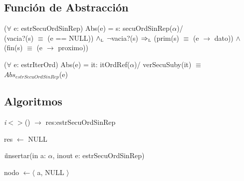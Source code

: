 \vspace{33pt}

\subsection*{Funci\'on de Abstracci\'on}
\vspace{11pt}
($\forall$ e: estrSecuOrdSinRep) Abs(e) = s: secuOrdSinRep($\alpha$)/\\
(vacia?(s) $\equiv$ (e == NULL)) $\land_{\mathrm{\scriptscriptstyle{L}}}$ $\neg$vacia?(s) $\Rightarrow_{\mathrm{\scriptscriptstyle{L}}}$ (prim(s) $\equiv$ (e $\rightarrow$ dato)) $\wedge$ (fin(s) $\equiv$ (e $\rightarrow$ proximo))

\vspace{22pt}

\vspace{11pt}
($\forall$ e: estrIterOrd) Abs(e) = it: itOrdRef($\alpha$)/ verSecuSuby(it) $\equiv$ $Abs_{estrSecuOrdSinRep}$(e)

\vspace{33pt}


\subsection*{Algoritmos}

\textit{i}$<>$() $\longrightarrow$ res:estrSecuOrdSinRep\\
\begin{algorithm}[H]
\BlankLine
res $\leftarrow$ NULL
\end{algorithm}

\textit{i}insertar(in a: $\alpha$, inout e: estrSecuOrdSinRep)\\
\begin{algorithm}[H]
\BlankLine
nodo $\leftarrow \langle$ a, NULL $\rangle$
\BlankLine
{}
\end{algorithm}

